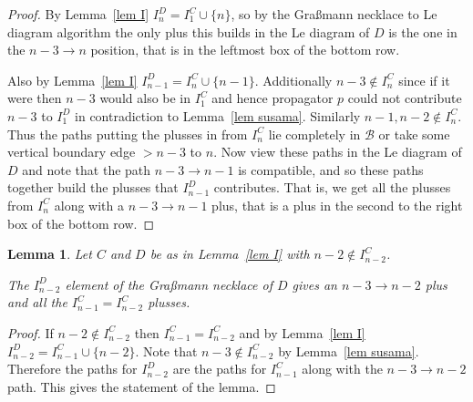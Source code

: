 \documentclass[11pt]{article}
\newtheorem{lem}[thm]{Lemma}
\theoremstyle{remark}
\theoremstyle{definition}
\begin{document}
\begin{proof}
  By Lemma~\ref{lem I} $I_n^{D}= I_1^{C} \cup \{n\}$, so by the Gra\ss mann necklace to Le diagram algorithm the only plus this builds in the Le diagram of $D$ is  the one in the $n-3\rightarrow n$ position, that is in the leftmost box of the bottom row.

  Also by Lemma~\ref{lem I} $I_{n-1}^{D} = I_n^{C} \cup \{n-1\}$.  Additionally $n-3\not\in I_{n}^{C}$ since if it were then $n-3$ would also be in $I_1^{C}$ and hence propagator $p$ could not contribute $n-3$ to $I_1^{D}$ in contradiction to Lemma~\ref{lem susama}.  Similarly $n-1, n-2\not\in I_n^{C}$.  Thus the paths putting the plusses in from $I_n^{C}$ lie completely in $\mathcal{B}$ or take some vertical boundary edge $>n-3$ to $n$.   Now view these paths in the Le diagram of $D$ and note that the path $n-3\rightarrow n-1$ is compatible, and so these paths together build the plusses that $I_{n-1}^{D}$ contributes.  That is, we get all the plusses from $I_{n}^{C}$ along with a $n-3\rightarrow n-1$ plus, that is a plus in the second to the right box of the bottom row.
\end{proof}

\begin{lem}\label{lem n-2 good}
  Let $C$ and $D$ be as in Lemma~\ref{lem I} with $n-2 \not\in I_{n-2}^{C}$.

  The $I_{n-2}^{D}$ element of the Gra\ss mann necklace of $D$ gives
  an $n-3\rightarrow n-2$ plus and
  all the $I_{n-1}^{C}=I_{n-2}^{C}$ plusses.
\end{lem}

\begin{proof}
  If $n-2\not\in I_{n-2}^{C}$ then $I_{n-1}^{C}=I_{n-2}^{C}$ and by Lemma~\ref{lem I} $I_{n-2}^{D} = I_{n-1}^{C} \cup \{n-2\}$.  Note that $n-3\not\in I_{n-2}^{C}$ by Lemma~\ref{lem susama}.  Therefore the paths for $I_{n-2}^{D}$ are the paths for $I_{n-1}^{C}$ along with the $n-3\rightarrow n-2$ path.  This gives the statement of the lemma.

\end{proof}
\end{document}
